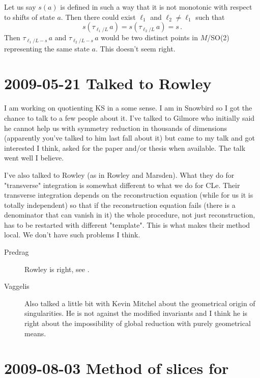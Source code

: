 \medskip{}
Let us say $s(a)$ is defined in such a way that it is not monotonic with respect to
shifts of state $a$.  Then there could exist $\ell_1$ and $\ell_2 \neq \ell_1$ such that
\[ s(\tau_{\ell_1/L}\,a) = s(\tau_{\ell_2/L}\,a) = s\,. \]
Then $\tau_{\ell_1/L - s}\,a$ and $\tau_{\ell_2/L - s}\,a$ would be two distinct points
in $M$/SO(2) representing the same state $a$.  This doesn't seem right.

\section{2009-05-21 Talked to Rowley}

I am working on quotienting KS in a some sense. I am in
Snowbird so I got the chance to talk to a few people about
it. I've talked to Gilmore who initially said he cannot help
us with symmetry reduction in thousands of dimensions
(apparently you've talked to him last fall about it) but came
to my talk and got interested I think, asked for the paper
and/or thesis when available. The talk went well I believe.

I've also talked to Rowley (as in Rowley and Marsden). What
they do for "transverse" integration is somewhat different to
what we do for CLe. Their transverse integration depends on
the reconstruction equation (while for us it is totally
independent) so that if the reconstruction equation fails
(there is a denominator that can vanish in it) the whole
procedure, not just reconstruction, has to be restarted with
different "template". This is what makes their method local.
We don't have such problems I think.

\begin{description}
\item[Predrag]
Rowley is right, see .

\item[Vaggelis]
Also talked a little bit with Kevin Mitchel about the
geometrical origin of singularities. He is not against the
modified invariants and I think he is right about the
impossibility of global reduction with purely geometrical
means.
\end{description}

\section{2009-08-03 Method of slices for \cLf}
\renewcommand{\ssp}{x}

